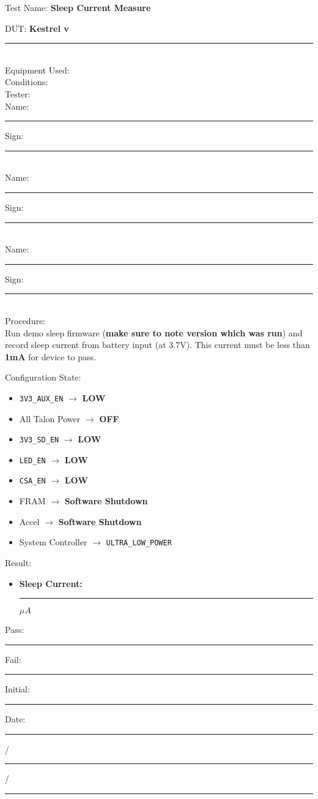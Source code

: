 \pagebreak
{\Huge Test Name: \textbf{Sleep Current Measure}}\\[20pt]
{\Large DUT: \textbf{Kestrel v}\rule{1cm}{0.15mm}} \\[10pt]
{\Large Equipment Used: }\\[40pt]
{\Large Conditions: }\\[40pt]
{\Large Tester: }\\[10pt]
Name: \rule{4cm}{0.15mm} \hfill Sign: \rule{4cm}{0.15mm}\\[5pt]
Name: \rule{4cm}{0.15mm} \hfill Sign: \rule{4cm}{0.15mm}\\[5pt]
Name: \rule{4cm}{0.15mm} \hfill Sign: \rule{4cm}{0.15mm}\\[15pt]
{\Large Procedure: }\\
Run demo sleep firmware (\textbf{make sure to note version which was run}) and record sleep current from battery input (at 3.7V). This current must be less than \textbf{1mA} for device to pass.

{\large Configuration State:}\\
\begin{itemize}
\item \texttt{3V3\_AUX\_EN} $\rightarrow$ \textbf{LOW}
\item All Talon Power $\rightarrow$ \textbf{OFF}
\item \texttt{3V3\_SD\_EN} $\rightarrow$ \textbf{LOW}
\item \texttt{LED\_EN} $\rightarrow$ \textbf{LOW}
\item \texttt{CSA\_EN} $\rightarrow$ \textbf{LOW}
\item FRAM $\rightarrow$ \textbf{Software Shutdown}
\item Accel $\rightarrow$ \textbf{Software Shutdown}
\item System Controller $\rightarrow$ \texttt{ULTRA\_LOW\_POWER}
\end{itemize}

{\Large Result:}\\

\begin{itemize}
\item \textbf{Sleep Current:} \rule{3cm}{0.15mm} $\mu A$
\end{itemize}

\vfill
{\large Pass: \rule{1cm}{0.15mm} \hspace{1cm} Fail: \rule{1cm}{0.15mm}} \hfill Initial: \rule{2cm}{0.15mm} \hspace{1cm} Date: \rule{0.5cm}{0.15mm}/\rule{0.5cm}{0.15mm}/\rule{1cm}{0.15mm}\\[5pt]